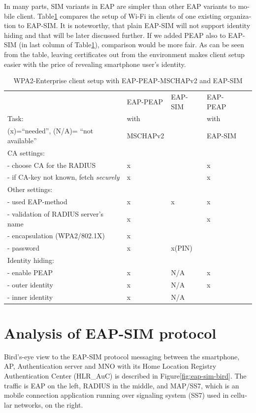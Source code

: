 \documentclass[12pt,a4paper,english]{tutthesis}
\begin{document}
\begin{otherlanguage}{english}
In many parts, SIM variants in EAP are simpler than other EAP
variants to mobile client.  Table\ref{table-peapsim} compares the setup of Wi-Fi
in clients of one existing organization to EAP-SIM. It
is noteworthy, that plain EAP-SIM will not support identity hiding and
that will be later discussed further. If we added PEAP
also to EAP-SIM (in last column of Table\ref{table-peapsim}), comparison would be more fair.
As can be seen from the table, leaving certificates out from the environment
makes client setup easier with the price of revealing smartphone user's
identity.  



\begin{table}[htb]
\caption{\label{table-peapsim}WPA2-Enterprise client setup with EAP-PEAP-MSCHAPv2 and EAP-SIM}
\centering
\begin{tabular}{|l|l|l|ll|}
\hline
 & EAP-PEAP & EAP-SIM & EAP-PEAP & \\
Task: & with &  & with & \\
(x)=``needed'', (N/A)= ``not available'' & MSCHAPv2 &  & EAP-SIM & \\
\hline
CA settings: &  &  &  & \\
- choose CA for the RADIUS & x &  & x & \\
- if CA-key not known, fetch \emph{securely} & x &  & x & \\
\hline
Other settings: &  &  &  & \\
- used EAP-method & x & x & x & \\
- validation of RADIUS server's name & x &  & x & \\
- encapsulation (WPA2/802.1X) & x &  &  & \\
- password & x & x(PIN) &  & \\
\hline
Identity hiding: &  &  &  & \\
- enable PEAP & x & N/A & x & \\
- outer identity & x & N/A & x & \\
- inner identity & x & N/A &  & \\
\hline
\end{tabular}
\end{table}

\section{Analysis of EAP-SIM protocol}
\label{sec-2-6}
Bird's-eye view to the EAP-SIM protocol messaging between the
smartphone, AP, Authentication server and MNO with its Home Location
Registry Authentication Center (HLR\_AuC) is described in
Figure\ref{fig:eap-sim-bird}.  The traffic is EAP on the left, RADIUS in the
middle, and MAP/SS7, which is an mobile connection application running
over signaling system (SS7) used in cellular networks, on the right.



\end{otherlanguage}
\end{document}
